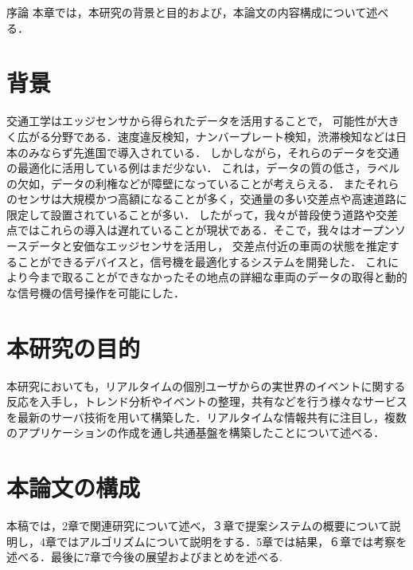 \chapterhead
{序論}
{本章では，本研究の背景と目的および，本論文の内容構成について述べる．}

\section{背景}
交通工学はエッジセンサから得られたデータを活用することで，
可能性が大きく広がる分野である．速度違反検知，ナンバープレート検知，渋滞検知などは日本のみならず先進国で導入されている．
しかしながら，それらのデータを交通の最適化に活用している例はまだ少ない．
これは，データの質の低さ，ラベルの欠如，データの利権などが障壁になっていることが考えらえる．
またそれらのセンサは大規模かつ高額になることが多く，交通量の多い交差点や高速道路に限定して設置されていることが多い．
したがって，我々が普段使う道路や交差点ではこれらの導入は遅れていることが現状である．そこで，我々はオープンソースデータと安価なエッジセンサを活用し，
交差点付近の車両の状態を推定することができるデバイスと，信号機を最適化するシステムを開発した．
これにより今まで取ることができなかったその地点の詳細な車両のデータの取得と動的な信号機の信号操作を可能にした．


\section{本研究の目的}
本研究においても，リアルタイムの個別ユーザからの実世界のイベントに関する反応を入手し，トレンド分析やイベントの整理，共有などを行う様々なサービスを最新のサーバ技術を用いて構築した．リアルタイムな情報共有に注目し，複数のアプリケーションの作成を通し共通基盤を構築したことについて述べる．

\section{本論文の構成}
本稿では，2章で関連研究について述べ，３章で提案システムの概要について説明し，4章ではアルゴリズムについて説明をする．5章では結果，６章では考察を述べる．最後に7章で今後の展望およびまとめを述べる.


\newpage
